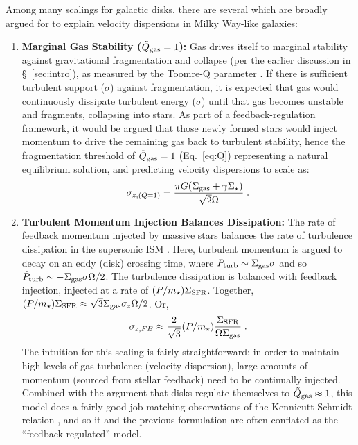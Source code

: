 \documentclass[usletter,fleqn,usenatbib]{mnras}
\newcommand{\be}{\begin{equation}}
\newcommand{\ee}{\end{equation}}
\begin{document}
Among many scalings for galactic disks, there are several which are broadly argued for to explain velocity dispersions in Milky Way-like galaxies:
\begin{enumerate}

\item \label{subsec:Q1theory} \textbf{Marginal Gas Stability ($\tilde Q_{\rm gas} = 1$):} Gas drives itself to marginal stability against gravitational fragmentation and collapse (per the earlier discussion in \S~\ref{sec:intro}), as measured by the Toomre-Q parameter \citep{Toomre1964}.  If there is sufficient turbulent support ($\sigma$) against fragmentation, it is expected that gas would continuously dissipate turbulent energy ($\sigma$) until that gas becomes unstable and fragments, collapsing into stars.  As part of a feedback-regulation framework, it would be argued that those newly formed stars would inject momentum to drive the remaining gas back to turbulent stability, hence the fragmentation threshold of $\tilde Q_{\rm gas} = 1$ (Eq.~\ref{eq:Q}) representing a natural equilibrium solution, and predicting velocity dispersions to scale as:
\be \label{eq:sigmaQ}
\sigma_{z,(Q=1)} =  \frac{\pi G (\Sigma_{\rm gas} + \gamma\Sigma_\star)}{\sqrt{2} \Omega}  \; .
\ee




\item \label{subsec:FBtheory} \textbf{Turbulent Momentum Injection Balances Dissipation:}  
The rate of feedback momentum injected by massive stars balances the rate of turbulence dissipation in the supersonic ISM \citep[e.g.,][]{Faucher-Giguere2013, Hayward2017}.  Here, turbulent momentum is argued to decay on an eddy (disk) crossing time, where $P_{\rm turb} \sim \Sigma_{\rm gas} \sigma$ and so $\dot P_{\rm turb} \sim -\Sigma_{\rm gas} \sigma \Omega/2$.  The turbulence dissipation is balanced with feedback injection, injected at a rate of $(P/m_\star)\Sigma_{\rm SFR}$.  Together, $(P/m_\star)\Sigma_{\rm SFR} \approx \sqrt{3}\Sigma_{\rm gas}\sigma_z\Omega/2$.  Or,
\be \label{eq:sigmaFB}
\sigma_{z,FB} \approx \frac{2}{\sqrt{3}} (P/m_\star) \frac{\Sigma_{\rm SFR}}{\Omega \Sigma_{\rm gas}}  \; .
\ee
The intuition for this scaling is fairly straightforward: in order to maintain high levels of gas turbulence (velocity dispersion), large amounts of momentum (sourced from stellar feedback) need to be continually injected.  Combined with the argument that disks regulate themselves to $\tilde Q_{\rm gas} \approx 1$, this model does a fairly good job matching observations of the Kennicutt-Schmidt relation \citep{Orr2018}, and so it and the previous formulation are often conflated as the ``feedback-regulated'' model.


\end{enumerate}
\end{document}
